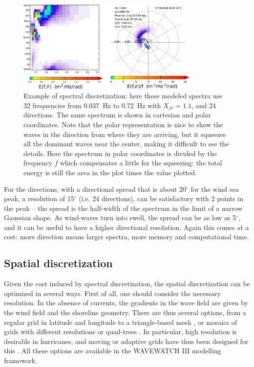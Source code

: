 \begin{figure}[htb]
\centerline{\includegraphics[width=0.8\textwidth]{FIGS_CH_MODEL/spectrum_discrete.pdf}}
\caption{Example of spectral discretization: here these modeled spectra use 32 frequencies from 0.037~Hz to 0.72~Hz with $X_{fr}=1.1$, and 24 directions. The same spectrum 
is shown in cartesian and polar coordinates. 
Note that the polar representation is nice to show the waves in the direction from where they are arriving, but it squeezes all the dominant waves near the center, 
making it difficult to see the details. Here the spectrum in polar coordinates is divided by the frequency $f$ which compensates a little for the squeezing: the 
total energy is still the area in the plot times the value plotted.}
\label{fig:sectral_discretization}
\end{figure}
For the directions, with a directional spread that is about 20$^\circ$ for the wind sea peak, a 
resolution of 15$^\circ$ (i.e. 24 directions), can be satisfactory with 2 points in the peak  -- the spread is the half-width of the spectrum in the 
limit of a narrow Gaussian shape. 
As wind-waves turn into swell, the spread can be as low as  5$^\circ$, 
and it can be useful to have a higher directional resolution. Again this comes at a cost: 
more direction means larger spectra, more memory and computational time. 



\subsection{Spatial discretization}
Given the cost induced by spectral discretization, the spatial discretization can be optimized in several ways. 
First of all, one should consider the necessary resolution. In the absence of currents, the gradients in the wave field are given by the 
wind field and the shoreline geometry. There are thus several options, from a regular grid in latitude and longitude to a triangle-based mesh
\citep[e.g.]{Benoit&al.1996,Roland&Ardhuin2014}, or mosaics of grids with different resolutions \citep{Tolman2008} or quad-trees \citep{Popinet&al.2010,Li2010}. 
In particular, high resolution is desirable in hurricanes, and moving or adaptive grids have thus been designed for this \citep{Tolman&Alves2005,Popinet&al.2010}. 
All these options are available in the WAVEWATCH III modelling framework. 

